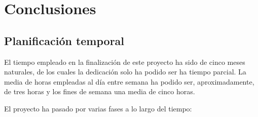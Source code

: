 \documentclass[a4paper, 12pt]{book}
\begin{document}

\cleardoublepage
\chapter{Conclusiones}
\label{chap:conclusiones}
 
\section{Planificaci\'on temporal}
\label{sec:planificacion-temporal}

El tiempo empleado en la finalizaci\'on de este proyecto ha sido de cinco meses naturales, de los cuales la dedicaci\'on solo ha podido ser ha tiempo parcial. La media de horas empleadas al d\'ia entre semana ha podido ser, aproximadamente, de tres horas y los fines de semana una media de cinco horas. 

El proyecto ha pasado por varias fases a lo largo del tiempo:
\end{document}
